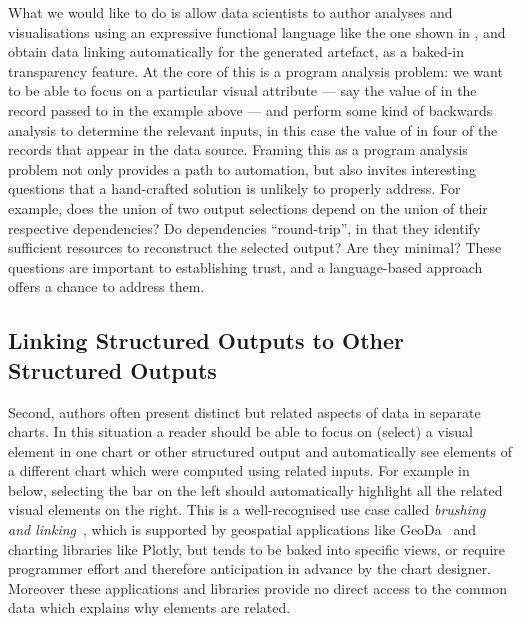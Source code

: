 What we would like to do is allow data scientists to author analyses and visualisations using an expressive functional language like the one shown in , and obtain data linking automatically for the generated artefact, as a baked-in transparency feature. At the core of this is a program analysis problem: we want to be able to focus on a particular visual attribute --- say the value of  in the record  passed to  in the example above --- and perform some kind of backwards analysis to determine the relevant inputs, in this case the value of  in four of the records that appear in the data source. Framing this as a program analysis problem not only provides a path to automation, but also invites interesting questions that a hand-crafted solution is unlikely to properly address. For example, does the union of two output selections depend on the union of their respective dependencies? Do dependencies ``round-trip'', in that they identify sufficient resources to reconstruct the selected output? Are they minimal? These questions are important to establishing trust, and a language-based approach offers a chance to address them.

\subsection{Linking Structured Outputs to Other Structured Outputs}
\label{sec:introduction:vis-linking}

Second, authors often present distinct but related aspects of data in separate charts. In this situation a reader should be able to focus on (select) a visual element in one chart or other structured output and automatically see elements of a different chart which were computed using related inputs. For example in  below, selecting the bar on the left should automatically highlight all the related visual elements on the right. This is a well-recognised use case called \emph{brushing and linking}~\cite{becker87}, which is supported by geospatial applications like GeoDa~\cite{anselin06} and charting libraries like Plotly, but tends to be baked into specific views, or require programmer effort and therefore anticipation in advance by the chart designer. Moreover these applications and libraries provide no direct access to the common data which explains why elements are related.

